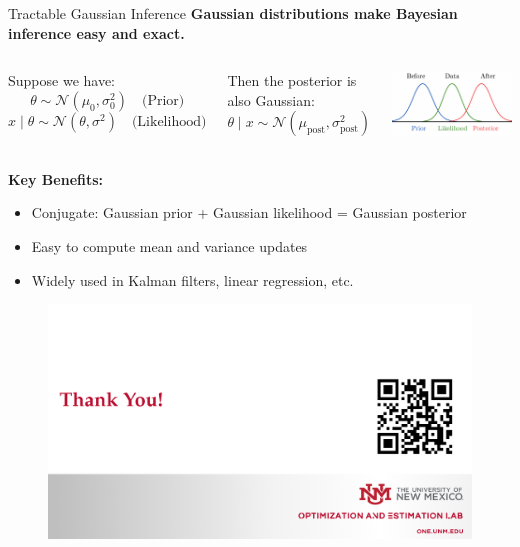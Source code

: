 \documentclass[handout,aspectratio=169]{beamer}
\begin{document}
\begin{frame}{Tractable Gaussian Inference}
  \textbf{Gaussian distributions make Bayesian inference easy and exact.}

  \vspace{1em}
  \begin{columns}
Suppose we have:
  \[
    \theta \sim \mathcal{N}(\mu_0, \sigma_0^2) \quad \text{(Prior)}
  \]
  \[
    x \mid \theta \sim \mathcal{N}(\theta, \sigma^2) \quad \text{(Likelihood)}
  \]

  \vspace{1em}
  Then the posterior is also Gaussian:
  \[
    \theta \mid x \sim \mathcal{N}(\mu_{\text{post}}, \sigma_{\text{post}}^2)
  \]
  
    \includegraphics[width=0.8\linewidth]{chapter_figs/01_figs/gaussian.png}
\end{columns}
  

  \vspace{0.5em}
  \textbf{Key Benefits:}
  \begin{itemize}
    \item Conjugate: Gaussian prior + Gaussian likelihood = Gaussian posterior
    \item Easy to compute mean and variance updates
    \item Widely used in Kalman filters, linear regression, etc.
  \end{itemize}

\end{frame}


\begin{frame}
	\begin{figure}[htbp]
		\centering
		\includegraphics[width=\textwidth]{chapter_figs/01_figs/thanks.png}
	\end{figure}
\end{frame}
\end{document}
